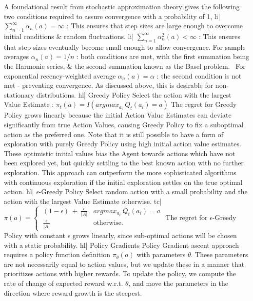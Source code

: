 A foundational result from stochastic approximation theory gives the following two conditions required to assure convergence with a probability of 1,
li| \( \sum_{n=1}^\infty \alpha_n(a) = \infty \) : This ensures that step sizes are large enough to overcome initial conditions & random fluctuations.
li| \( \sum_{n=1}^{\infty} \alpha_n^2(a) < \infty \) : This ensures that step sizes eventually become small enough to allow convergence.
For sample averages \( \alpha_n(a) = 1/n \) : both conditions are met, with the first summation being the Harmonic series, & the second summation known as the Basel problem. 
For exponential recency-weighted average \( \alpha_n(a) = \alpha \) : the second condition is not met - preventing convergence. As discussed above, this is desirable for non-stationary distributions.
hl| Greedy Policy
Select the action with the largest Value Estimate : \( \pi_t(a) = I(argmax_{a_i} \ Q_t(a_i) = a) \)
The regret for Greedy Policy grows linearly because the initial Action Value Estimates can deviate significantly from true Action Values, causing Greedy Policy to fix a suboptimal action as the preferred one. Note that it is still possible to have a form of exploration with purely Greedy Policy using high initial action value estimates. These optimistic initial values bias the Agent towards actions which have not been explored yet, but quickly settling to the best known action with no further exploration. This approach can outperform the more sophisticated algorithms with continuous exploration if the initial exploration settles on the true optimal action.
hl| \(\epsilon\)-Greedy Policy
Select random action with a small probability and the action with the largest Value Estimate otherwise.
tc| \( \pi(a) = \begin{cases} \ (1 - \epsilon) \ + \ \frac{\epsilon}{|A|} & argmax_{a_i} \ Q_t(a_i)=a \\ \ \frac{\epsilon}{|A|} & \text{otherwise.} \end{cases} \)
The regret for \(\epsilon\)-Greedy Policy with constant \(\epsilon\) grows linearly, since sub-optimal actions will be chosen with a static probability.
hl| Policy Gradients
Policy Gradient ascent approach requires a policy function definition \(\pi_\theta(a)\) with parameters \(\theta\). These parameters are not necessarily equal to action values, but we update these in a manner that prioritizes actions with higher rewards. To update the policy, we compute the rate of change of expected reward w.r.t. \(\theta\), and move the parameters in the direction where reward growth is the steepest.
